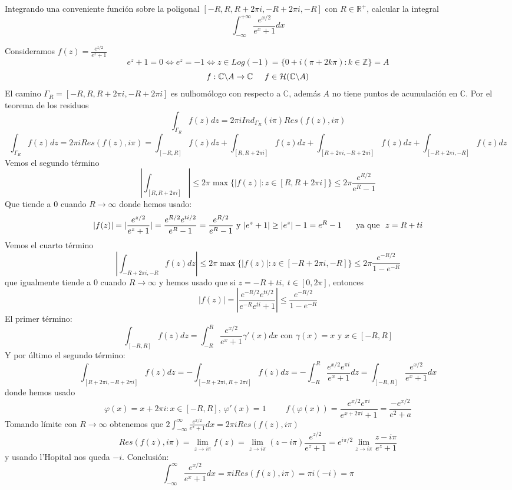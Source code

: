 \begin{ejer}
	Integrando una conveniente función sobre la poligonal $[-R,R,R+2\pi i,-R+2\pi i,-R]$ con $R\in\mathbb{R}^+$, calcular la integral
	$$ \int_{-\infty}^{+\infty} \frac{e^{x/2}}{e^x+1}dx $$
\end{ejer}
\begin{sol}

Consideramos 
$f(z) = \frac{e^{z/2}}{e^z+1}$
$$e^z+1=0 \Longleftrightarrow e^z = -1 \Longleftrightarrow z\in Log(-1) = \{ 0+i(\pi+2k\pi) : k\in\mathbb{Z} \} = A$$
$$f : \mathbb{C}\backslash A \rightarrow \mathbb{C}\hspace{0.5cm} f\in\mathcal{H}(\mathbb{C}\backslash A)$$
El camino $\Gamma_R  = [-R,R,R+2\pi i, -R+2\pi i]$ es nulhomólogo con respecto a $\mathbb{C}$, además $A$ no tiene puntos de acumulación en $\mathbb{C}$.
Por el teorema de los residuos
$$\int_{\Gamma_R} f(z)dz = 2\pi i Ind_{\Gamma_R}(i\pi) Res(f(z),i\pi)$$
$$\int_{\Gamma_R} f(z)dz = 2\pi i Res(f(z),i\pi) = \int_{[-R,R]} f(z)dz + \int_{[R,R+2\pi i]} f(z)dz + \int_{[R+2\pi i, -R+2\pi i]} f(z)dz + \int_{[-R+2\pi i, -R]} f(z)dz$$
Vemos el segundo término
$$\left| \int_{[R,R+2\pi i]} \right| \leq 2\pi\max\{ |f(z)| : z\in [R,R+2\pi i] \} \leq 2\pi \frac{e^{R/2}}{e^R-1} $$
Que tiende a $0$ cuando $R\rightarrow \infty$
donde hemos usado:
$$|f(z)| = |\frac{e^{z/2}}{e^z+1}| = \frac{e^{R/2} e^{ti/2}}{e^R-1} = \frac{e^{R/2}}{e^R-1} \text{ y } |e^z+1| \geq |e^z|-1 = e^R-1 \hspace{0.5cm}\text{ ya que \ }z=R+ti$$
Vemos el cuarto término
$$\left| \int_{-R+2\pi i, -R} f(z)dz \right| \leq 2\pi \max \{ |f(z)| : z\in[-R+2\pi i, -R] \} \leq 2\pi \frac{e^{-R/2}}{1-e^{-R}} $$ que igualmente tiende a $0$ cuando $R\rightarrow\infty$ y hemos usado que si $z= -R+ti, \ t\in[0,2\pi]$, entonces
$$|f(z)| = \left| \frac{e^{-R/2}e^{ti/2}}{e^{-R}e^{ti}+1} \right| \leq \frac{e^{-R/2}}{1-e^{-R}}$$
El primer término:
$$\int_{[-R,R]} f(z)dz = \int_{-R}^{R} \frac{e^{x/2}}{e^x+1} \gamma'(x)dx \text{ con } \gamma(x)=x \text{ y }x\in[-R,R]$$
Y por último el segundo término:
$$\int_{[R+2\pi i, -R+2\pi i]} f(z)dz = -\int_{[-R+2\pi i, R+2\pi i]} f(z)dz = -\int_{-R}^{R} \frac{e^{x/2}e^{\pi i}}{e^x+1}dz = \int_{[-R,R]} \frac{e^{x/2}}{e^x+1}dx$$
donde hemos usado
$$\varphi (x) = x+2\pi i : x\in[-R,R], \ \varphi'(x) = 1 \hspace{1cm} f(\varphi(x)) = \frac{e^{x/2}e^{\pi i}}{e^{x+2\pi i}+1} = \frac{-e^{x/2}}{e^2+a}$$
Tomando límite con $R\rightarrow\infty$ obtenemos que
$2\int_{-\infty}^{\infty} \frac{e^{x/2}}{e^x+1} dx = 2\pi iRes(f(z),i\pi)$
$$Res(f(z),i\pi) = \lim_{z\rightarrow i\pi} f(z) = \lim_{z\rightarrow i\pi} (z-i\pi) \frac{e^{z/2}}{e^z+1} = e^{i\pi/2} \lim_{z\rightarrow i\pi} \frac{z-i\pi}{e^z+1}$$
y usando l'Hopital nos queda
$-i$.
Conclusión:
$$\int_{-\infty}^{\infty} \frac{e^{x/2}}{e^x+1} dx = \pi iRes(f(z),i\pi) = \pi i(-i) = \pi $$
\end{sol}

